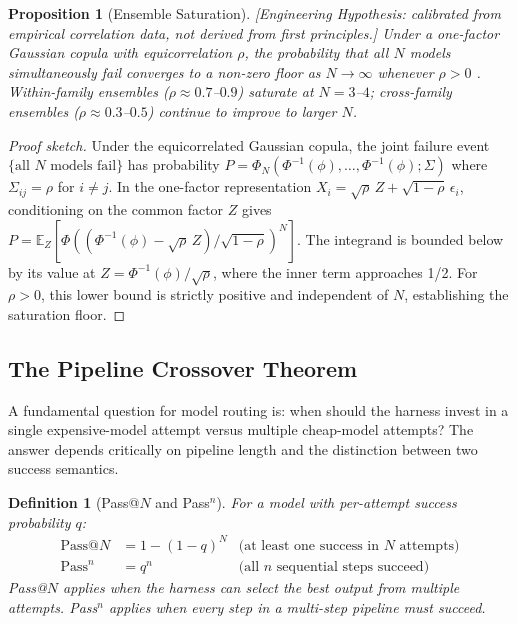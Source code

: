 \documentclass[11pt, a4paper]{googledeepmind}
\newtheorem{definition}{Definition}[section]
\newtheorem{proposition}{Proposition}[section]
\begin{document}
\begin{proposition}[Ensemble Saturation]
\emph{[Engineering Hypothesis: calibrated from empirical correlation data, not derived from first principles.]}
\label{prop:routing-saturation}
Under a one-factor Gaussian copula with equicorrelation $\rho$, the probability that all $N$ models simultaneously fail converges to a non-zero floor as $N \to \infty$ whenever $\rho > 0$ \citep{correlatedensemble2026}. Within-family ensembles ($\rho \approx 0.7$--$0.9$) saturate at $N = 3$--$4$; cross-family ensembles ($\rho \approx 0.3$--$0.5$) continue to improve to larger $N$.
\end{proposition}

\begin{proof}[Proof sketch]
Under the equicorrelated Gaussian copula, the joint failure event $\{\text{all } N \text{ models fail}\}$ has probability $P = \Phi_N(\Phi^{-1}(\phi), \ldots, \Phi^{-1}(\phi); \Sigma)$ where $\Sigma_{ij} = \rho$ for $i \neq j$. In the one-factor representation $X_i = \sqrt{\rho}\,Z + \sqrt{1-\rho}\,\epsilon_i$, conditioning on the common factor $Z$ gives $P = \mathbb{E}_Z[\Phi((\Phi^{-1}(\phi) - \sqrt{\rho}\,Z)/\sqrt{1-\rho})^N]$. The integrand is bounded below by its value at $Z = \Phi^{-1}(\phi)/\sqrt{\rho}$, where the inner term approaches 1/2. For $\rho > 0$, this lower bound is strictly positive and independent of $N$, establishing the saturation floor.
\end{proof}

\subsection{The Pipeline Crossover Theorem}

A fundamental question for model routing is: when should the harness invest in a single expensive-model attempt versus multiple cheap-model attempts? The answer depends critically on pipeline length and the distinction between two success semantics.

\begin{definition}[Pass@$N$ and Pass${}^n$]
\label{def:routing-pass}
For a model with per-attempt success probability $q$:
\begin{align}
\text{Pass@}N &= 1 - (1-q)^N & \text{(at least one success in $N$ attempts)} \\
\text{Pass}^n &= q^n & \text{(all $n$ sequential steps succeed)}
\end{align}
Pass@$N$ applies when the harness can select the best output from multiple attempts. Pass${}^n$ applies when every step in a multi-step pipeline must succeed.
\end{definition}
\end{document}
